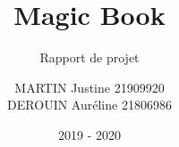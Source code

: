 \documentclass[report]{BetterDocument}
\title{Magic Book}
\subtitle{Rapport de projet}
\author{MARTIN Justine 21909920\\
	DEROUIN Auréline 21806986\\
}
\date{2019 - 2020}
\institute{Unicaen}
\begin{document}
	\pageDeGarde

	\tableDesMatieres

	

	

	

	

	
\end{document}
